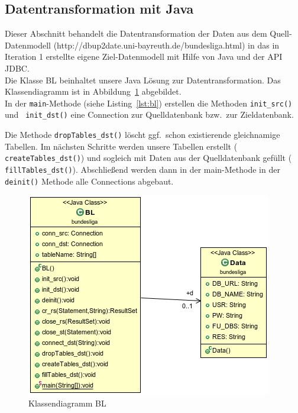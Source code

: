 \documentclass[
10pt,
a4paper
]{scrartcl}
\begin{document}
\subsection{Datentransformation mit Java}

Dieser Abschnitt behandelt die Datentransformation der Daten aus dem Quell-Datenmodell (http://dbup2date.uni-bayreuth.de/bundesliga.html) in das in Iteration 1 erstellte eigene Ziel-Datenmodell mit Hilfe von Java und der API JDBC.\\

Die Klasse BL beinhaltet unsere Java L\"{o}sung zur Datentransformation. Das Klassendiagramm ist in Abbildung~\ref{fig:BL} abgebildet.\\

In der  \texttt{main}-Methode (siehe Listing~\ref{lst:bl}) erstellen die Methoden  \texttt{init\_src()} und \texttt{ init\_dst()} eine Connection zur Quelldatenbank bzw.~zur Zieldatenbank.



Die Methode \texttt{dropTables\_dst()} l\"{o}scht ggf.~schon existierende gleichnamige Tabellen. Im n\"{a}chsten Schritte werden unsere Tabellen erstellt ( \texttt{createTables\_dst()}) und sogleich mit Daten aus der Quelldatenbank gef\"{u}llt ( \texttt{fillTables\_dst()}). Abschlie{\ss}end werden dann in der main-Methode in der  \texttt{deinit()} Methode alle Connections abgebaut.

\begin{figure}[H]
\centering
\includegraphics[scale=0.7]{BL.png}
\caption{Klassendiagramm BL}
\label{fig:BL}
\end{figure}
\end{document}
